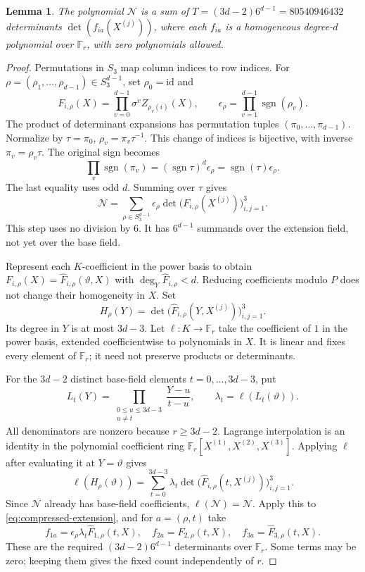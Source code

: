 \documentclass[11pt]{article}
\newtheorem{lemma}{Lemma}
\begin{document}
\begin{lemma}\label{lem:compression}
The polynomial \(\mathcal N\) is a sum of
\(T=(3d-2)6^{d-1}=80540946432\) determinants
\(\det(f_{ia}(X^{(j)}))\), where each \(f_{ia}\) is a homogeneous
degree-\(d\) polynomial over \(\mathbb F_r\), with zero polynomials allowed.
\end{lemma}
\begin{proof}
Permutations in \(S_3\) map column indices to row indices.
For \(\rho=(\rho_1,\ldots,\rho_{d-1})\in S_3^{d-1}\), set
\(\rho_0=\mathrm{id}\) and
\[
 F_{i,\rho}(X)=\prod_{v=0}^{d-1}\sigma^v Z_{\rho_v(i)}(X),\qquad
 \epsilon_\rho=\prod_{v=1}^{d-1}\operatorname{sgn}(\rho_v).
\]
The product of determinant expansions has permutation tuples
\((\pi_0,\ldots,\pi_{d-1})\). Normalize by
\(\tau=\pi_0\), \(\rho_v=\pi_v\tau^{-1}\).
This change of indices is bijective, with inverse \(\pi_v=\rho_v\tau\).
The original sign becomes
\[
 \prod_v\operatorname{sgn}(\pi_v)
  =(\operatorname{sgn}\tau)^d\epsilon_\rho
  =\operatorname{sgn}(\tau)\epsilon_\rho.
\]
The last equality uses odd \(d\). Summing over \(\tau\) gives
\begin{equation}\label{eq:compressed-extension}
 \mathcal N=\sum_{\rho\in S_3^{d-1}}\epsilon_\rho
       \det\bigl(F_{i,\rho}(X^{(j)})\bigr)_{i,j=1}^3.
\end{equation}
This step uses no division by \(6\). It has \(6^{d-1}\) summands
over the extension field, not yet over the base field.

Represent each \(K\)-coefficient in the power basis to obtain
\(F_{i,\rho}(X)=\widehat F_{i,\rho}(\vartheta,X)\) with
\(\deg_Y\widehat F_{i,\rho}<d\). Reducing coefficients modulo \(P\)
does not change their homogeneity in \(X\).
Set
\[
 H_\rho(Y)=\det\bigl(\widehat F_{i,\rho}(Y,X^{(j)})\bigr)_{i,j=1}^3.
\]
Its degree in \(Y\) is at most \(3d-3\).
Let \(\ell:K\to\mathbb F_r\) take the coefficient of \(1\) in the
power basis, extended coefficientwise to polynomials in \(X\).
It is linear and fixes every element of \(\mathbb F_r\); it need not
preserve products or determinants.

For the \(3d-2\) distinct base-field elements \(t=0,\ldots,3d-3\), put
\[
 L_t(Y)=\prod_{\substack{0\le u\le3d-3\\u\ne t}}\frac{Y-u}{t-u},
 \qquad \lambda_t=\ell(L_t(\vartheta)).
\]
All denominators are nonzero because \(r\ge3d-2\).
Lagrange interpolation is an identity in the polynomial coefficient
ring \(\mathbb F_r[X^{(1)},X^{(2)},X^{(3)}]\). Applying \(\ell\)
after evaluating it at \(Y=\vartheta\) gives
\[
 \ell(H_\rho(\vartheta))
  =\sum_{t=0}^{3d-3}\lambda_t
      \det\bigl(\widehat F_{i,\rho}(t,X^{(j)})\bigr)_{i,j=1}^3.
\]
Since \(\mathcal N\) already has base-field coefficients,
\(\ell(\mathcal N)=\mathcal N\). Apply this to
\eqref{eq:compressed-extension}, and for \(a=(\rho,t)\) take
\[
 f_{1a}=\epsilon_\rho\lambda_t\widehat F_{1,\rho}(t,X),\quad
 f_{2a}=\widehat F_{2,\rho}(t,X),\quad
 f_{3a}=\widehat F_{3,\rho}(t,X).
\]
These are the required \((3d-2)6^{d-1}\) determinants over
\(\mathbb F_r\). Some terms may be zero; keeping them gives the
fixed count independently of \(r\).
\end{proof}
\end{document}
